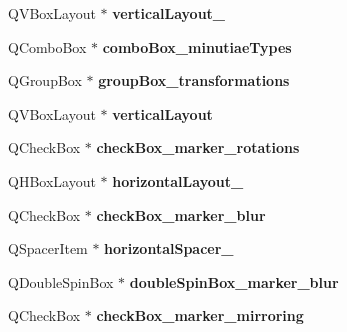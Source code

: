 \begin{DoxyCompactItemize}
\item 
\mbox{\label{class_ui___main_window_a0c01bad60d9f422a1258e710635a2f65}} 
Q\+V\+Box\+Layout $\ast$ {\bfseries vertical\+Layout\+\_}
\item 
\mbox{\label{class_ui___main_window_a47f9a4311639242298c07e5e99fbc6f0}} 
Q\+Combo\+Box $\ast$ {\bfseries combo\+Box\+\_\+minutiae\+Types}
\item 
\mbox{\label{class_ui___main_window_adbd41143d6b1f3c0d32a37e2a5161377}} 
Q\+Group\+Box $\ast$ {\bfseries group\+Box\+\_\+transformations}
\item 
\mbox{\label{class_ui___main_window_aecd96a04789fcfec3f98d80390ad8184}} 
Q\+V\+Box\+Layout $\ast$ {\bfseries vertical\+Layout}
\item 
\mbox{\label{class_ui___main_window_aa64887a7c96744598906ae9ebcabfc12}} 
Q\+Check\+Box $\ast$ {\bfseries check\+Box\+\_\+marker\+\_\+rotations}
\item 
\mbox{\label{class_ui___main_window_a8cfe172f7719cf363fc630c536cad6c3}} 
Q\+H\+Box\+Layout $\ast$ {\bfseries horizontal\+Layout\+\_}
\item 
\mbox{\label{class_ui___main_window_a111674db6129aa1ec47354c99aa87e5d}} 
Q\+Check\+Box $\ast$ {\bfseries check\+Box\+\_\+marker\+\_\+blur}
\item 
\mbox{\label{class_ui___main_window_af0ccf7674274075e2495c3ad7a62f19b}} 
Q\+Spacer\+Item $\ast$ {\bfseries horizontal\+Spacer\+\_}
\item 
\mbox{\label{class_ui___main_window_a7e0c4abc3a2850906f96c61126aca942}} 
Q\+Double\+Spin\+Box $\ast$ {\bfseries double\+Spin\+Box\+\_\+marker\+\_\+blur}
\item 
\mbox{\label{class_ui___main_window_ac8c54a18aa79a4446819e3f69bc8fb77}} 
Q\+Check\+Box $\ast$ {\bfseries check\+Box\+\_\+marker\+\_\+mirroring}
\item 

\end{DoxyCompactItemize}
